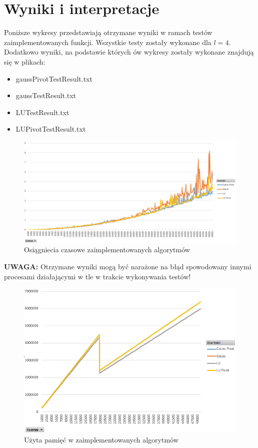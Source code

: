 \documentclass[a4paper,14pt]{report}
\begin{document}
\chapter{Wyniki i interpretacje}
  Poniższe wykresy przedstawiają otrzymane wyniki w ramach testów zaimplementowanych funkcji. Wszystkie testy zostały wykonane dla $l=4$. Dodatkowo wyniki, na podstawie których ów wykresy zostały wykonane znajdują się w plikach:
  \begin{itemize}
    \item gaussPivotTestResult.txt
    \item gaussTestResult.txt
    \item LUTestResult.txt
    \item LUPivotTestResult.txt
  \end{itemize}
  \begin{figure}[H]
      \includegraphics[scale=0.5]{wykres1}
      \centering
      \caption{Osiągniecia czasowe zaimplementowanych algorytmów}
  \end{figure}
  \textbf{UWAGA:} Otrzymane wyniki mogą być narażone na błąd spowodowany innymi procesami działającymi w tle w trakcie wykonywania testów! \\
  \begin{figure}[H]
    \includegraphics[scale=0.5]{wykres2}
      \centering
      \caption{Użyta pamięć w zaimplementowanych algorytmów}
  \end{figure}
\end{document}
